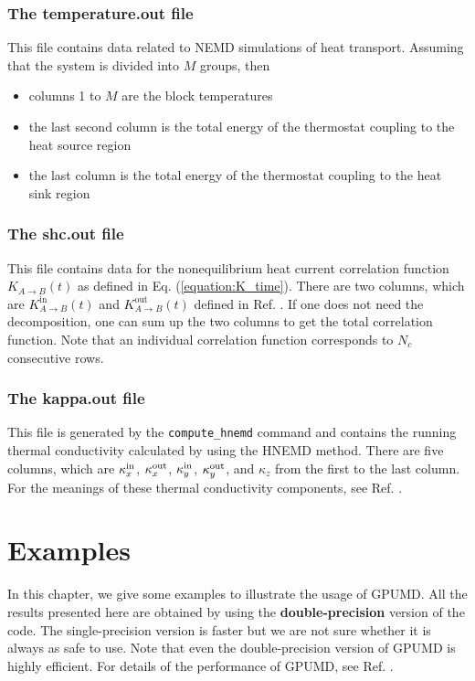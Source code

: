 \documentclass[12pt,a4paper]{report}
\begin{document}
\subsection{The temperature.out file}

This file contains data related to NEMD simulations of heat transport. Assuming that the system is divided into $M$ groups, then
\begin{itemize}
\item columns 1 to $M$ are the block temperatures
\item the last second column is the total energy of the thermostat coupling to the heat source region
\item the last column is the total energy of the thermostat coupling to the heat sink region
\end{itemize}


\subsection{The shc.out file}

This file contains data for the nonequilibrium heat current correlation function $K_{A \rightarrow B}(t)$ as defined in Eq. (\ref{equation:K_time}). There are two columns, which are $K_{A \rightarrow B}^{\text{in}}(t)$ and $K_{A \rightarrow B}^{\text{out}}(t)$ defined in Ref. \cite{fan2017prb}. If one does not need the decomposition, one can sum up the two columns to get the total correlation function. Note that an individual correlation function corresponds to $N_c$ consecutive rows.


\subsection{The kappa.out file}

This file is generated by the \verb"compute_hnemd" command and contains the running thermal conductivity calculated by using the HNEMD method. There are five columns, which are $\kappa^{\rm in}_x$, $\kappa^{\rm out}_x$, $\kappa^{\rm in}_y$, $\kappa^{\rm out}_y$, and $\kappa_z$ from the first to the last column. For the meanings of these thermal conductivity components, see Ref. \cite{fan2018submitted,xu2018submitted,dong2018submitted}.

\chapter{Examples}

In this chapter, we give some examples to illustrate the usage of GPUMD. All the results presented here are obtained by using the \textbf{double-precision} version of the code. The single-precision version is faster but we are not sure whether it is always as safe to use.
Note that even the double-precision version of GPUMD is highly efficient. For details of the performance of GPUMD, see Ref. \cite{fan2017cpc}.
\end{document}
